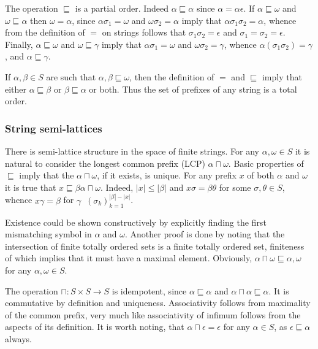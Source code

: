 \documentclass[a4paper]{article}
\newcommand{\brac}[1]{{\left ( #1 \right )}}
\newcommand{\abs}[1]{{\left | #1 \right |}}
\newcommand{\defn}{\mathop{\overset{\Delta}{=}}\nolimits}
\begin{document}
The operation $\sqsubseteq$ is a partial order. Indeed $\alpha\sqsubseteq\alpha$ since $\alpha = \alpha\epsilon$. If $\alpha\sqsubseteq \omega$ and $\omega \sqsubseteq \alpha$ then $\omega=\alpha$, since $\alpha\sigma_1=\omega$ and $\omega\sigma_2=\alpha$ imply that $\alpha\sigma_1\sigma_2 = \alpha$, whence from the definition of $=$ on strings follows that $\sigma_1\sigma_2=\epsilon$ and $\sigma_1=\sigma_2=\epsilon$. Finally, $\alpha\sqsubseteq\omega$ and $\omega\sqsubseteq\gamma$ imply that $\alpha\sigma_1=\omega$ and $\omega\sigma_2=\gamma$, whence $\alpha(\sigma_1\sigma_2)=\gamma$, and $\alpha\sqsubseteq\gamma$.

If $\alpha, \beta\in S$ are such that $\alpha,\beta\sqsubseteq \omega$, then the definition of $=$ and $\sqsubseteq$ imply that either $\alpha\sqsubseteq\beta$ or $\beta\sqsubseteq\alpha$ or both. Thus the set of prefixes of any string is a total order.


\subsubsection{String semi-lattices} %
\label{ssub:string_semi_lattice}

There is semi-lattice structure in the space of finite strings. For any $\alpha,\omega\in S$ it is natural to consider the longest common prefix (LCP) $\alpha\sqcap \omega$. Basic properties of $\sqsubseteq$ imply that the $\alpha\sqcap \omega$, if it exists, is unique. For any prefix $x$ of both $\alpha$ and $\omega$ it is true that $x\sqsubseteq \beta \alpha\sqcap\omega$. Indeed, $\abs{x}\leq \abs{\beta}$ and $x\sigma = \beta\theta$ for some $\sigma,\theta\in S$, whence $x\gamma = \beta$ for $\gamma \defn \brac{\sigma_k}_{k=1}^{\abs{\beta}-\abs{x}}$.

Existence could be shown constructively by explicitly finding the first mismatching symbol in $\alpha$ and $\omega$. Another proof is done by noting that the intersection of finite totally ordered sets is a finite totally ordered set, finiteness of which implies that it must have a maximal element. Obviously, $\alpha\sqcap \omega\sqsubseteq \alpha,\omega$ for any $\alpha,\omega\in S$. 

The operation $\sqcap:S\times S\to S$ is idempotent, since $\alpha\sqsubseteq\alpha$ and $\alpha\sqcap \alpha \sqsubseteq \alpha$. It is commutative by definition and uniqueness. Associativity follows from maximality of the common prefix, very much like associativity of infimum follows from the aspects of its definition. It is worth noting, that $\alpha\sqcap \epsilon = \epsilon$ for any $\alpha\in S$, as $\epsilon\sqsubseteq \alpha$ always.
\end{document}

